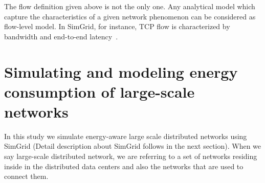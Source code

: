 The flow definition given above is not the only one. Any analytical model which capture the characteristics of a given network phenomenon can be considered as flow-level model. In SimGrid, for instance, TCP flow is characterized by bandwidth and end-to-end latency~\cite{DBLP:journals/jpdc/CasanovaGLQS14}.

\section{Simulating and modeling energy consumption of large-scale networks}

In this study we simulate energy-aware large scale distributed networks using SimGrid (Detail description about SimGrid follows in the next section). When we say large-scale distributed network, we are referring to a set of networks residing inside in the distributed data centers and also the networks that are used to connect them. 

